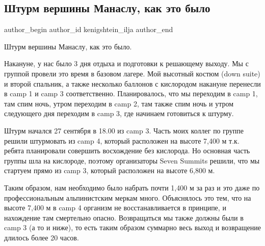  
 
 
 
 
 
\subsection{Штурм вершины Манаслу, как это было}
\label{sec:05_10_2021.fb.kenigshtein_ilja.1.shturm_manaslu}
 
\ifcmt
 author_begin
   author_id kenigshtein_ilja
 author_end
\fi

Штурм вершины Манаслу, как это было. 

Накануне, у нас было 3 дня отдыха и подготовки к решающему выходу. Мы с группой
провели это время в базовом лагере. Мой высотный костюм (down suite) и второй
спальник, а также несколько баллонов с кислородом  накануне перенесли в camp 1
и camp 3 соответственно. Планировалось, что мы переходим в camp 1, там спим
ночь, утром переходим в camp 2, там также спим ночь и утром следующего дня
переходим в camp 3, где начинаем готовиться к штурму. 


Штурм начался 27 сентября в 18.00 из camp 3. Часть моих коллег по группе решили
штурмовать из camp 4, который расположен на высоте 7,400 м т.к. ребята
планировали совершить восхождение без кислорода. Но основная часть группы шла
на кислороде, поэтому организаторы Seven Summits решили, что мы стартуем прямо
из camp 3, который расположен на высоте 6,800 м. 


Таким образом, нам необходимо
было набрать почти 1,400 м за раз и это даже по профессиональным альпинистским
меркам много. Объяснялось это тем, что на высоте 7,400 м в camp 4 организм не
восстанавливается в принципе, и нахождение там смертельно опасно. Возвращаться
мы также должны были в camp 3 (а то и ниже), то есть таким образом суммарно
весь выход и возвращение длилось более 20 часов. 

